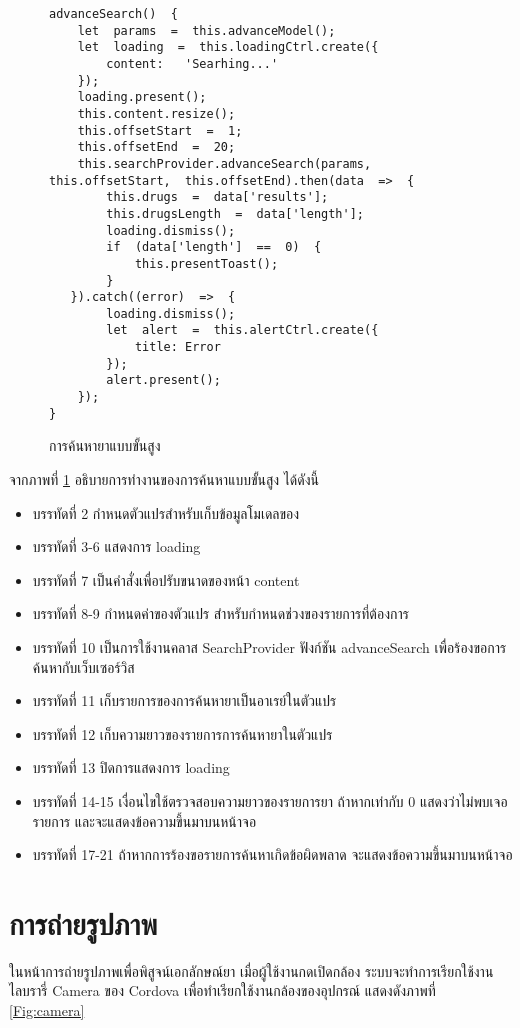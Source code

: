	\begin{figure}[H]
		{\begin{lstlisting}
advanceSearch()  {        
	let  params  =  this.advanceModel();        
	let  loading  =  this.loadingCtrl.create({            
		content:   'Searhing...'        
	});        
    loading.present();        
	this.content.resize();        
	this.offsetStart  =  1;        
	this.offsetEnd  =  20;        
	this.searchProvider.advanceSearch(params,  this.offsetStart,  this.offsetEnd).then(data  =>  {          
		this.drugs  =  data['results'];            
		this.drugsLength  =  data['length'];            
		loading.dismiss();            
		if  (data['length']  ==  0)  {                
			this.presentToast();            
		}        
   }).catch((error)  =>  {            
        loading.dismiss();            
        let  alert  =  this.alertCtrl.create({  
            title: Error  
	    });            
	    alert.present();        
	});    
}    
		\end{lstlisting}}
		\caption{การค้นหายาแบบขั้นสูง}
		\label{Fig:searchAdvance}
	\end{figure}
	จากภาพที่ \ref{Fig:searchAdvance} อธิบายการทำงานของการค้นหาแบบขั้นสูง ได้ดังนี้
	\begin{itemize}[label={--}]
		\item บรรทัดที่ 2	กำหนดตัวแปรสำหรับเก็บข้อมูลโมเดลของ
		\item บรรทัดที่ 3-6	แสดงการ loading 
		\item บรรทัดที่ 7	เป็นคำสั่งเพื่อปรับขนาดของหน้า content
		\item บรรทัดที่ 8-9	กำหนดค่าของตัวแปร สำหรับกำหนดช่วงของรายการที่ต้องการ
		\item บรรทัดที่ 10	เป็นการใช้งานคลาส SearchProvider ฟังก์ชัน advanceSearch เพื่อร้องขอการค้นหากับเว็บเซอร์วิส
		\item บรรทัดที่ 11	เก็บรายการของการค้นหายาเป็นอาเรย์ในตัวแปร
		\item บรรทัดที่ 12	เก็บความยาวของรายการการค้นหายาในตัวแปร
		\item บรรทัดที่ 13	ปิดการแสดงการ loading
		\item บรรทัดที่ 14-15	เงื่อนไขใช้ตรวจสอบความยาวของรายการยา ถ้าหากเท่ากับ 0 แสดงว่าไม่พบเจอรายการ และจะแสดงข้อความขึ้นมาบนหน้าจอ
		\item บรรทัดที่ 17-21	ถ้าหากการร้องขอรายการค้นหาเกิดข้อผิดพลาด จะแสดงข้อความขึ้นมาบนหน้าจอ
		
	\end{itemize}


\section{การถ่ายรูปภาพ}
	ในหน้าการถ่ายรูปภาพเพื่อพิสูจน์เอกลักษณ์ยา 
	เมื่อผู้ใช้งานกดเปิดกล้อง 
	ระบบจะทำการเรียกใช้งานไลบรารี่ Camera ของ Cordova 
	เพื่อทำเรียกใช้งานกล้องของอุปกรณ์ 
	แสดงดังภาพที่ \ref{Fig:camera}

